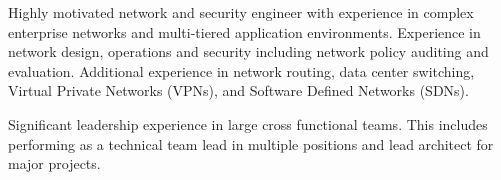 Highly motivated network and security engineer with experience in complex
enterprise networks and multi-tiered application environments. Experience in
network design, operations and security including network policy auditing and
evaluation. Additional experience in network routing, data center switching,
Virtual Private Networks (VPNs), and Software Defined Networks (SDNs).

Significant leadership experience in large cross functional teams. This
includes performing as a technical team lead in multiple positions and lead
architect for major projects.
